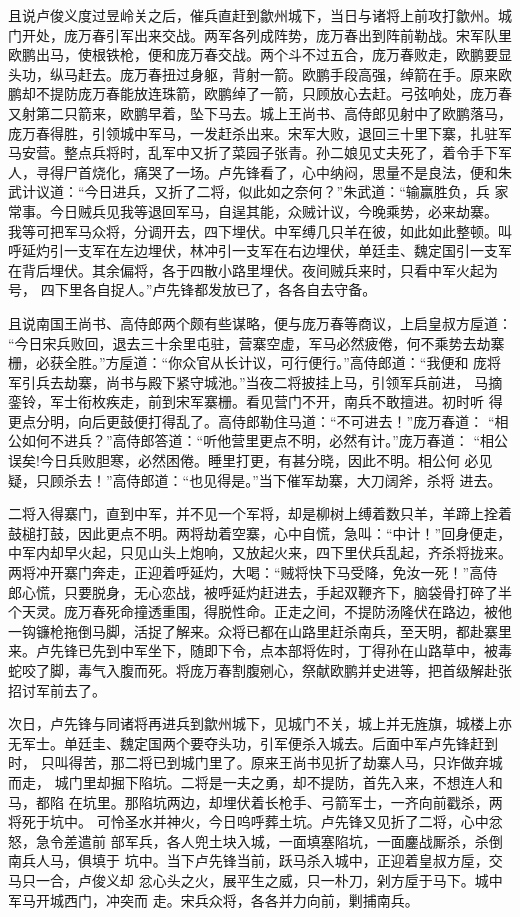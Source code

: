 且说卢俊义度过昱岭关之后，催兵直赶到歙州城下，当日与诸将上前攻打歙州。城
门开处，庞万春引军出来交战。两军各列成阵势，庞万春出到阵前勒战。宋军队里
欧鹏出马，使根铁枪，便和庞万春交战。两个斗不过五合，庞万春败走，欧鹏要显
头功，纵马赶去。庞万春扭过身躯，背射一箭。欧鹏手段高强，绰箭在手。原来欧
鹏却不提防庞万春能放连珠箭，欧鹏绰了一箭，只顾放心去赶。弓弦响处，庞万春
又射第二只箭来，欧鹏早着，坠下马去。城上王尚书、高侍郎见射中了欧鹏落马，
庞万春得胜，引领城中军马，一发赶杀出来。宋军大败，退回三十里下寨，扎驻军
马安营。整点兵将时，乱军中又折了菜园子张青。孙二娘见丈夫死了，着令手下军
人，寻得尸首烧化，痛哭了一场。卢先锋看了，心中纳闷，思量不是良法，便和朱
武计议道：“今日进兵，又折了二将，似此如之奈何？”朱武道：“输赢胜负，兵
家常事。今日贼兵见我等退回军马，自逞其能，众贼计议，今晚乘势，必来劫寨。
我等可把军马众将，分调开去，四下埋伏。中军缚几只羊在彼，如此如此整顿。叫
呼延灼引一支军在左边埋伏，林冲引一支军在右边埋伏，单廷圭、魏定国引一支军
在背后埋伏。其余偏将，各于四散小路里埋伏。夜间贼兵来时，只看中军火起为号，
四下里各自捉人。”卢先锋都发放已了，各各自去守备。

且说南国王尚书、高侍郎两个颇有些谋略，便与庞万春等商议，上启皇叔方垕道：
“今日宋兵败回，退去三十余里屯驻，营寨空虚，军马必然疲倦，何不乘势去劫寨
栅，必获全胜。”方垕道：“你众官从长计议，可行便行。”高侍郎道：“我便和
庞将军引兵去劫寨，尚书与殿下紧守城池。”当夜二将披挂上马，引领军兵前进，
马摘銮铃，军士衔枚疾走，前到宋军寨栅。看见营门不开，南兵不敢擅进。初时听
得更点分明，向后更鼓便打得乱了。高侍郎勒住马道：“不可进去！”庞万春道：
“相公如何不进兵？”高侍郎答道：“听他营里更点不明，必然有计。”庞万春道：
“相公误矣!今日兵败胆寒，必然困倦。睡里打更，有甚分晓，因此不明。相公何
必见疑，只顾杀去！”高侍郎道：“也见得是。”当下催军劫寨，大刀阔斧，杀将
进去。

二将入得寨门，直到中军，并不见一个军将，却是柳树上缚着数只羊，羊蹄上拴着
鼓槌打鼓，因此更点不明。两将劫着空寨，心中自慌，急叫：“中计！”回身便走，
中军内却早火起，只见山头上炮响，又放起火来，四下里伏兵乱起，齐杀将拢来。
两将冲开寨门奔走，正迎着呼延灼，大喝：“贼将快下马受降，免汝一死！”高侍
郎心慌，只要脱身，无心恋战，被呼延灼赶进去，手起双鞭齐下，脑袋骨打碎了半
个天灵。庞万春死命撞透重围，得脱性命。正走之间，不提防汤隆伏在路边，被他
一钩镰枪拖倒马脚，活捉了解来。众将已都在山路里赶杀南兵，至天明，都赴寨里
来。卢先锋已先到中军坐下，随即下令，点本部将佐时，丁得孙在山路草中，被毒
蛇咬了脚，毒气入腹而死。将庞万春割腹剜心，祭献欧鹏并史进等，把首级解赴张
招讨军前去了。

次日，卢先锋与同诸将再进兵到歙州城下，见城门不关，城上并无旌旗，城楼上亦
无军士。单廷圭、魏定国两个要夺头功，引军便杀入城去。后面中军卢先锋赶到时，
只叫得苦，那二将已到城门里了。原来王尚书见折了劫寨人马，只诈做弃城而走，
城门里却掘下陷坑。二将是一夫之勇，却不提防，首先入来，不想连人和马，都陷
在坑里。那陷坑两边，却埋伏着长枪手、弓箭军士，一齐向前戳杀，两将死于坑中。
可怜圣水并神火，今日呜呼葬土坑。卢先锋又见折了二将，心中忿怒，急令差遣前
部军兵，各人兜土块入城，一面填塞陷坑，一面鏖战厮杀，杀倒南兵人马，俱填于
坑中。当下卢先锋当前，跃马杀入城中，正迎着皇叔方垕，交马只一合，卢俊义却
忿心头之火，展平生之威，只一朴刀，剁方垕于马下。城中军马开城西门，冲突而
走。宋兵众将，各各并力向前，剿捕南兵。

